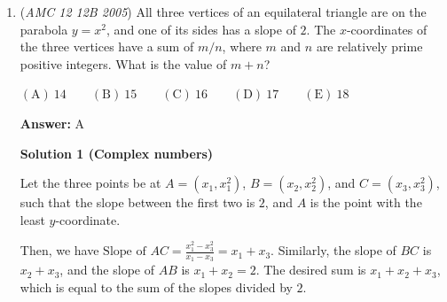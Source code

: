 \begin{enumerate}
 Now we know the coefficients of $10^{3z}$ and $10^{2z}$ which are $\frac{-1}{2}$ and $\frac{30}{2}$ respectively. Adding the two coefficients we obtain an answer of $\frac{29}{2}.$ $\Rightarrow$ $\boxed{B}$ (Author: David Camacho)

 



\textbf{Solution 4 (Alcumus)}

From the given conditions it follows that
 \[ x+y=10^z, \quad x^2+y^2=10\cdot 10^z\quad\text{and}\quad 10^{2z}=(x+y)^2=x^2+2xy+y^2. \]Thus
 \[ xy=\frac{1}{2}(10^{2z}-10\cdot 10^z). \]Also
 \[ (x+y)^3=10^{3z}\quad\text{and}\quad x^3+y^3=(x+y)^3-3xy(x+y), \]which yields
 \begin{align*} x^3+y^3&=10^{3z}-\frac{3}{2}(10^{2z}-10\cdot 10^z)(10^z) \\ &=10^{3z}-\frac{3}{2}(10^{3z}-10\cdot 10^{2z}) =-\frac{1}{2}10^{3z}+15\cdot 10^{2z}, \end{align*}
and $a+b=-\frac{1}{2}+15=\boxed{29/2}$.

 No other value of $a + b$ is possible for all members of $S$, because the triple $\left(\frac{1}{2}(1 + \sqrt{19}), \frac{1}{2}(1 - \sqrt{19}), 0\right)$ is in $S$, and for this ordered triple, the equation $x^3 + y^3 = a\cdot 10^{3z} + b\cdot 10^{2z}$ reduces to $a + b = 29/2$.

 


	\item (\textit{AMC 12 12B 2005}) All three vertices of an equilateral triangle are on the parabola $y=x^2$, and one of its sides has a slope of $2$.  The $x$-coordinates of the three vertices have a sum of $m/n$, where $m$ and $n$ are relatively prime positive integers.  What is the value of $m+n$?


 $\mathrm{(A)}\ {{{14}}} \qquad \mathrm{(B)}\ {{{15}}} \qquad \mathrm{(C)}\ {{{16}}} \qquad \mathrm{(D)}\ {{{17}}} \qquad \mathrm{(E)}\ {{{18}}}$

 \textbf{Answer: }A



\textbf{Solution 1 (Complex numbers)}

Let the three points be at $A = (x_1, x_1^2)$, $B = (x_2, x_2^2)$, and $C = (x_3, x_3^2)$, such that the slope between the first two is $2$, and $A$ is the point with the least $y$-coordinate.

 Then, we have $\textrm{Slope of }AC = \frac{x_1^2 - x_3^2}{x_1 - x_3} = x_1 + x_3$. Similarly, the slope of $BC$ is $x_2 + x_3$, and the slope of $AB$ is $x_1 + x_2 = 2$. The desired sum is $x_1 + x_2 + x_3$, which is equal to the sum of the slopes divided by $2$.


\end{enumerate}
